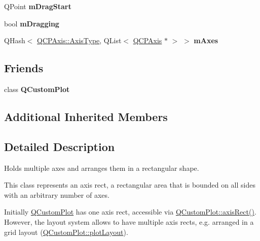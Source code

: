 \begin{DoxyCompactItemize}
\item 
Q\+Point {\bfseries m\+Drag\+Start}\hypertarget{class_q_c_p_axis_rect_a032896b28f83a58010d8d533b78c49df}{}\label{class_q_c_p_axis_rect_a032896b28f83a58010d8d533b78c49df}

\item 
bool {\bfseries m\+Dragging}\hypertarget{class_q_c_p_axis_rect_ab49a6698194cf0e9e38a1d734c0888a8}{}\label{class_q_c_p_axis_rect_ab49a6698194cf0e9e38a1d734c0888a8}

\item 
Q\+Hash$<$ \hyperlink{class_q_c_p_axis_ae2bcc1728b382f10f064612b368bc18a}{Q\+C\+P\+Axis\+::\+Axis\+Type}, Q\+List$<$ \hyperlink{class_q_c_p_axis}{Q\+C\+P\+Axis} $\ast$ $>$ $>$ {\bfseries m\+Axes}\hypertarget{class_q_c_p_axis_rect_afe7a24d2a2bea98fc552fa826350ba81}{}\label{class_q_c_p_axis_rect_afe7a24d2a2bea98fc552fa826350ba81}

\end{DoxyCompactItemize}
\subsection*{Friends}
\begin{DoxyCompactItemize}
\item 
class {\bfseries Q\+Custom\+Plot}\hypertarget{class_q_c_p_axis_rect_a1cdf9df76adcfae45261690aa0ca2198}{}\label{class_q_c_p_axis_rect_a1cdf9df76adcfae45261690aa0ca2198}

\end{DoxyCompactItemize}
\subsection*{Additional Inherited Members}


\subsection{Detailed Description}
Holds multiple axes and arranges them in a rectangular shape. 

This class represents an axis rect, a rectangular area that is bounded on all sides with an arbitrary number of axes.

Initially \hyperlink{class_q_custom_plot}{Q\+Custom\+Plot} has one axis rect, accessible via \hyperlink{class_q_custom_plot_a4a37a1add5fe63060ac518cf0a4c4050}{Q\+Custom\+Plot\+::axis\+Rect()}. However, the layout system allows to have multiple axis rects, e.\+g. arranged in a grid layout (\hyperlink{class_q_custom_plot_afd280d4d621ae64a106543a545c508d7}{Q\+Custom\+Plot\+::plot\+Layout}).

